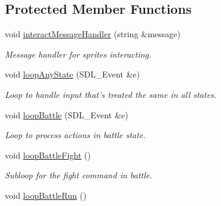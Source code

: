 \subsection*{Protected Member Functions}
\begin{DoxyCompactItemize}
\item 
void \hyperlink{class_game_state_ad80bf372b6f644a79b31e97fc4b61532}{interact\+Message\+Handler} (string \&message)\hypertarget{class_game_state_ad80bf372b6f644a79b31e97fc4b61532}{}\label{class_game_state_ad80bf372b6f644a79b31e97fc4b61532}

\begin{DoxyCompactList}\small\item\em Message handler for sprites interacting. \end{DoxyCompactList}\item 
void \hyperlink{class_game_state_a6bcac85dc5a7ce95e58c32d0948b54df}{loop\+Any\+State} (S\+D\+L\+\_\+\+Event \&e)\hypertarget{class_game_state_a6bcac85dc5a7ce95e58c32d0948b54df}{}\label{class_game_state_a6bcac85dc5a7ce95e58c32d0948b54df}

\begin{DoxyCompactList}\small\item\em Loop to handle input that’s treated the same in all states. \end{DoxyCompactList}\item 
void \hyperlink{class_game_state_a78ccdca45d646c8bec157fb6207ada04}{loop\+Battle} (S\+D\+L\+\_\+\+Event \&e)\hypertarget{class_game_state_a78ccdca45d646c8bec157fb6207ada04}{}\label{class_game_state_a78ccdca45d646c8bec157fb6207ada04}

\begin{DoxyCompactList}\small\item\em Loop to process actions in battle state. \end{DoxyCompactList}\item 
void \hyperlink{class_game_state_a8eababbfcac6ae424541fb61e8534682}{loop\+Battle\+Fight} ()\hypertarget{class_game_state_a8eababbfcac6ae424541fb61e8534682}{}\label{class_game_state_a8eababbfcac6ae424541fb61e8534682}

\begin{DoxyCompactList}\small\item\em Subloop for the \textquotesingle{}fight\textquotesingle{} command in battle. \end{DoxyCompactList}\item 
void \hyperlink{class_game_state_ac3101f8eba8251f27acfcf082140908d}{loop\+Battle\+Run} ()\hypertarget{class_game_state_ac3101f8eba8251f27acfcf082140908d}{}\label{class_game_state_ac3101f8eba8251f27acfcf082140908d}


\end{DoxyCompactItemize}
